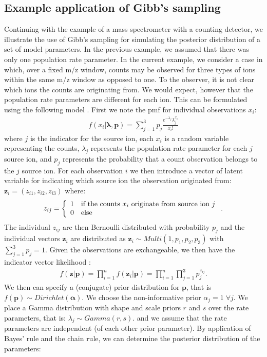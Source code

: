 \begin{DoubleSpace*}
\subsection{Example application of Gibb's sampling}
Continuing with the example of a mass spectrometer with a counting detector, we illustrate the use of Gibb's sampling for simulating the posterior distribution of a set of model parameters. In the previous example, we assumed that there was only one population rate parameter. In the current example, we consider a case in which, over a fixed m/z window, counts may be observed for three types of ions within the same m/z window as opposed to one. To the observer, it is not clear which ions the counts are originating from. We would expect, however that the population rate parameters are different for each ion. This can be formulated using the following model \cite{diebolt1994,everitt2004}. First we note the pmf for individual observations $x_i$:
\begin{align}
	f(x_i|\boldsymbol{\lambda},\textbf{p})=\sum_{j=1}^3 p_j \frac{e^{-\lambda_j} \lambda_j^{x_i}}{x_i!}
\end{align}
where $j$ is the indicator for the source ion, each $x_i$ is a random variable representing the counts, $\lambda_j$ represents the population rate parameter for each $j$ source ion, and $p_j$ represents the probability that a count observation belongs to the $j$ source ion. For each observation $i$ we then introduce a vector of latent variable for indicating which source ion the observation originated from: $\textbf{z}_i=(z_{i1}, z_{i2},z_{i3})$ where:
\begin{align}
	z_{ij}= \left\{ \begin{array}{c l}
	1 & \text{if the counts $x_i$ originate from source ion $j$}   \\ 
	0 & \text{else} 
	\end{array} \right. .
\end{align}
The individual $z_{ij}$ are then Bernoulli distributed with probability $p_j$ and the individual vectors $\textbf{z}_i$ are distributed as $\textbf{z}_{i} \sim Multi(1,p_1,p_2,p_3)$ with $\sum_{j=1}^3 p_j =1$. Given the observations are exchangeable, we then have the indicator vector likelihood :
\begin{align}
	 f(\textbf{z}|\textbf{p})= \prod_{i=1}^n f(\textbf{z}_i|\textbf{p}) = \prod_{i=1}^n \prod_{j=1}^3 p_j^{z_{ij}}.
\end{align}
We then can specify a (conjugate) prior distribution for $\textbf{p}$, that is $f(\textbf{p})\sim Dirichlet(\boldsymbol{\alpha})$. We choose the non-informative prior $\alpha_j=1 \; \forall j$. We place a Gamma distribution with shape and scale priors $r$ and $s$ over the rate parameters, that is: $\lambda_j \sim Gamma(r,s)$. and we assume that the rate parameters are independent (of each other prior parameter). By application of Bayes' rule and the chain rule, we can determine the posterior distribution of the parameters:

\end{DoubleSpace*}
